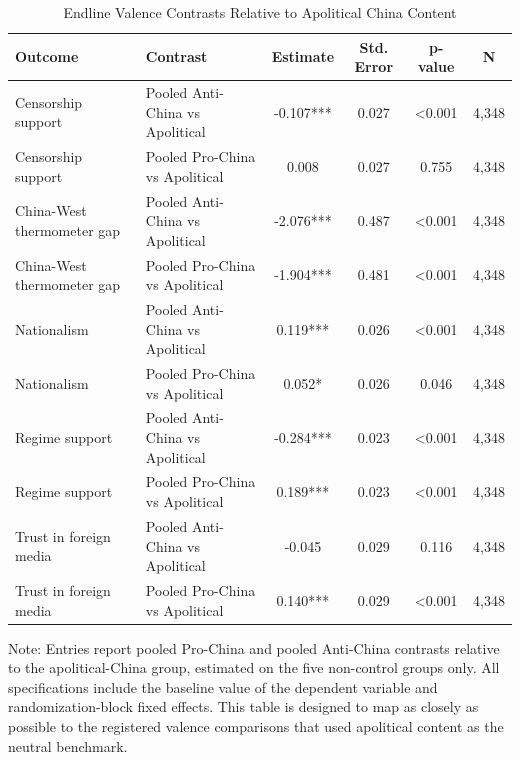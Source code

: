 \begin{table}[H]
\centering
\caption{Endline Valence Contrasts Relative to Apolitical China Content}
\label{tab:valence_vs_apolitical_t1}
\footnotesize
\begin{threeparttable}
\begin{tabular}{llcccc}
\toprule
Outcome & Contrast & Estimate & Std. Error & p-value & N \\
\midrule
Censorship support & Pooled Anti-China vs Apolitical & -0.107*** & 0.027 & <0.001 & 4,348 \\
Censorship support & Pooled Pro-China vs Apolitical & 0.008 & 0.027 & 0.755 & 4,348 \\
China-West thermometer gap & Pooled Anti-China vs Apolitical & -2.076*** & 0.487 & <0.001 & 4,348 \\
China-West thermometer gap & Pooled Pro-China vs Apolitical & -1.904*** & 0.481 & <0.001 & 4,348 \\
Nationalism & Pooled Anti-China vs Apolitical & 0.119*** & 0.026 & <0.001 & 4,348 \\
Nationalism & Pooled Pro-China vs Apolitical & 0.052* & 0.026 & 0.046 & 4,348 \\
Regime support & Pooled Anti-China vs Apolitical & -0.284*** & 0.023 & <0.001 & 4,348 \\
Regime support & Pooled Pro-China vs Apolitical & 0.189*** & 0.023 & <0.001 & 4,348 \\
Trust in foreign media & Pooled Anti-China vs Apolitical & -0.045 & 0.029 & 0.116 & 4,348 \\
Trust in foreign media & Pooled Pro-China vs Apolitical & 0.140*** & 0.029 & <0.001 & 4,348 \\
\bottomrule
\end{tabular}
\begin{tablenotes}[flushleft]
\footnotesize
\item Note: Entries report pooled Pro-China and pooled Anti-China contrasts relative to the apolitical-China group, estimated on the five non-control groups only. All specifications include the baseline value of the dependent variable and randomization-block fixed effects. This table is designed to map as closely as possible to the registered valence comparisons that used apolitical content as the neutral benchmark.
\end{tablenotes}
\end{threeparttable}
\end{table}
